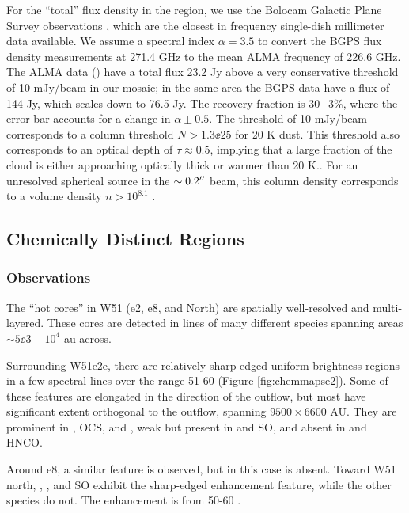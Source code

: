\documentclass{aa}
\begin{document}
For the ``total'' flux density in the region, we use the Bolocam Galactic Plane
Survey observations \citep{Aguirre2011a,Ginsburg2013a}, which are the closest
in frequency single-dish millimeter data available.  We assume a spectral index
$\alpha=3.5$ to convert the BGPS flux density measurements at 271.4 GHz to the
mean ALMA frequency of 226.6 GHz.  The ALMA data () have a total flux 23.2 Jy above a very conservative
threshold of 10 mJy/beam in our
mosaic; in the same area the BGPS data have a flux of 144 Jy, which scales down to
76.5 Jy.  The recovery fraction is 30$\pm3$\%, where the error bar accounts
for a change in $\alpha\pm0.5$.  The threshold of 10 mJy/beam corresponds to a
column threshold $N>1.3\ee{25}$ \percc for 20 K dust. This threshold also
corresponds to an optical depth of $\tau\approx0.5$, implying that a large
fraction of the cloud is either approaching optically thick or warmer than 20
K..  For an unresolved spherical source in the $\sim0.2\mbox{$^{\prime\prime}$}$ beam, this
column density corresponds to a volume density $n>10^{8.1}$ \percc.


\subsection{Chemically Distinct Regions}
\label{sec:chemistrymaps}
\subsubsection{Observations}
The ``hot cores'' in W51 (e2, e8, and North) are spatially well-resolved and
multi-layered.  These cores are detected in lines of many different species
spanning areas $\sim5\ee{3}-10^4$ au across.

Surrounding W51e2e, there are relatively sharp-edged uniform-brightness regions
in a few spectral lines over the range 51-60 \kms (Figure
\ref{fig:chemmapse2}).  Some of these features are elongated in the direction
of the outflow, but most have significant extent orthogonal to the outflow,
spanning $9500\times6600$ AU.  They are prominent in \methanol, OCS, and
\dimethylether, weak but present in \formaldehyde and SO, and absent in
\cyanoacetylene and HNCO.

Around e8, a similar feature is observed, but in this case \dimethylether is absent.
Toward W51 north, \methanol, \formaldehyde, and SO exhibit the sharp-edged
enhancement feature, while the other species do not.  The enhancement is from
50-60 \kms.
\end{document}
